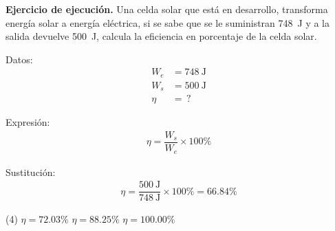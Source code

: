 \documentclass[12pt, letter]{exam}
\begin{document}
\begin{questions}
    \setcounter{question}{36} \question \label{Ejercicio_15} \textbf{Ejercicio de ejecución. } Una celda solar que está en desarrollo, transforma energía solar a energía eléctrica, si se sabe que se le suministran \SI{748}{\joule} y a la salida devuelve \SI{500}{\joule}, calcula la eficiencia en porcentaje de la celda solar.

    \begin{minipage}[t]{0.35\linewidth}
    Datos: 
    \begin{align*}
    W_{e} &= \SI{748}{\joule} \\
    W_{s} &= \SI{500}{\joule} \\
    \eta &= \, ?
    \end{align*}
    \end{minipage}
    \hspace{1cm}
    \begin{minipage}[t]{0.4\linewidth}
    Expresión:
    \begin{align*}
        \eta = \dfrac{W_{s}}{W_{e}} \times 100 \%
    \end{align*}
    \end{minipage}

    Sustitución:
    \begin{align*}
    \eta = \dfrac{\SI{500}{\joule}}{\SI{748}{\joule}} \times 100 \% = \num{66.84} \%
    \end{align*}
    \begin{tasks}(4)
        \task {}
        \task $\eta = 72.03 \%$
        \task $\eta = 88.25 \%$
        \task $\eta = 100.00 \%$
    \end{tasks}

\end{questions}
\end{document}
